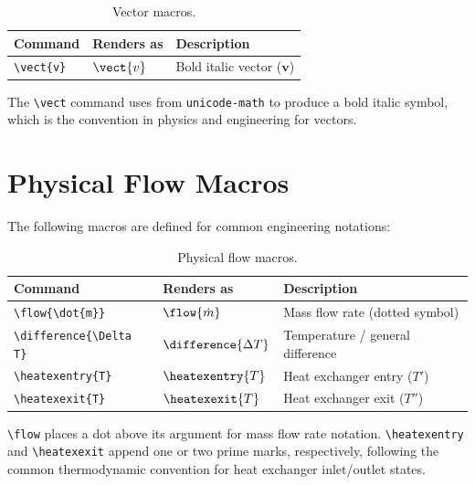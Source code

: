 \begin{table}[htbp]
  \centering
  \caption{Vector macros.}
  \label{tab:vectors}
  \begin{tabular}{@{}lll@{}}
    \toprule
    Command & Renders as & Description \\
    \midrule
    \texttt{\textbackslash vect\{v\}} & $\vect{v}$ & Bold italic vector ($\symbf{v}$) \\
    \bottomrule
  \end{tabular}
\end{table}

The \texttt{\textbackslash vect} command uses  from
\texttt{unicode-math} to produce a bold italic symbol, which is the
convention in physics and engineering for vectors.

\section{Physical Flow Macros}

The following macros are defined for common engineering notations:

\begin{table}[htbp]
  \centering
  \caption{Physical flow macros.}
  \label{tab:flow-macros}
  \begin{tabular}{@{}lll@{}}
    \toprule
    Command & Renders as & Description \\
    \midrule
    \texttt{\textbackslash flow\{\textbackslash dot\{m\}\}}   & $\flow{\dot{m}}$   & Mass flow rate (dotted symbol) \\
    \texttt{\textbackslash difference\{\textbackslash Delta T\}} & $\difference{\Delta T}$ & Temperature / general difference \\
    \texttt{\textbackslash heatexentry\{T\}}                    & $\heatexentry{T}$  & Heat exchanger entry ($T'$) \\
    \texttt{\textbackslash heatexexit\{T\}}                     & $\heatexexit{T}$   & Heat exchanger exit ($T''$) \\
    \bottomrule
  \end{tabular}
\end{table}

\texttt{\textbackslash flow} places a dot above its argument for mass
flow rate notation.  \texttt{\textbackslash heatexentry} and
\texttt{\textbackslash heatexexit} append one or two prime marks,
respectively, following the common thermodynamic convention for heat
exchanger inlet/outlet states.

